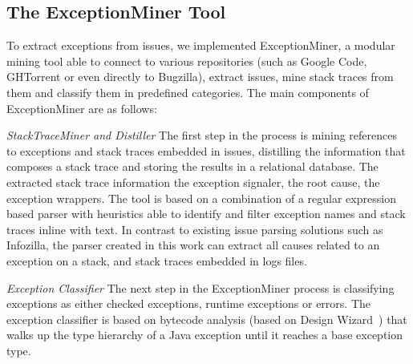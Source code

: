 \documentclass[conference]{IEEEtran}
\begin{document}
\subsection{The ExceptionMiner Tool}
\label{sec:exceptionminer}

To extract exceptions from issues, we implemented ExceptionMiner, a modular
mining tool able to connect to various repositories (such as Google Code,
GHTorrent or even directly to Bugzilla), extract issues, mine stack traces from
them and classify them in predefined categories. The main components of
ExceptionMiner are as follows:

\noindent\emph{StackTraceMiner and Distiller} The first step in the process is
mining references to exceptions and stack traces embedded in issues, distilling
the information that composes a stack trace and storing the results in a
relational database. The extracted stack trace information  the exception
signaler, the root cause, the exception wrappers. The tool is based on a
combination of a regular expression based parser with heuristics able to
identify and filter exception names and stack traces inline with text. In
contrast to existing issue parsing solutions such as Infozilla, the parser
created in this work can extract all causes related to an exception on a stack,
and stack traces embedded in logs files.



\noindent\emph{Exception Classifier} The next step in the ExceptionMiner process
is classifying exceptions as either checked exceptions, runtime exceptions or 
errors. The exception classifier is based on bytecode analysis (based on Design
Wizard~\cite{Brunet09}) that walks up the type hierarchy of a Java exception
until it reaches a base exception type.
\end{document}
